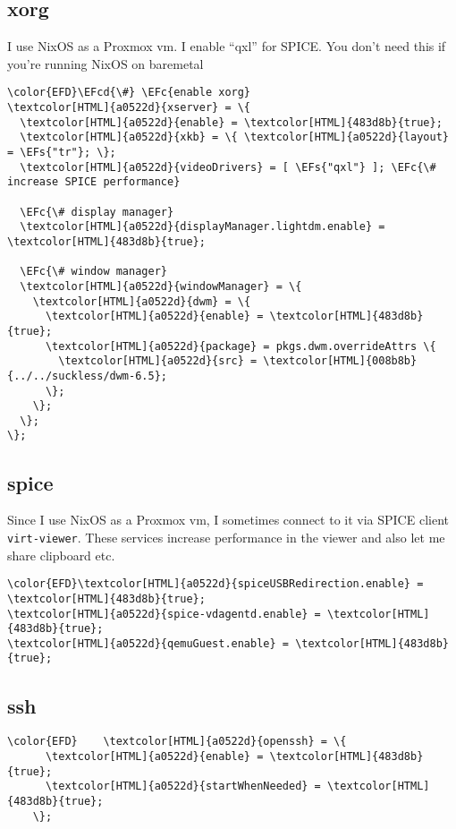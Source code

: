 \documentclass[14pt]{article}
\newcommand{\EFc}[1]{\textcolor{EFc}{#1}} %
\newcommand{\EFcd}[1]{\textcolor{EFcd}{#1}} %
\newcommand{\EFs}[1]{\textcolor{EFs}{#1}} %
\begin{document}
\subsection{xorg}
\label{sec:org418e294}
I use NixOS as a Proxmox vm. I enable ``qxl'' for SPICE. You don't need this if you're running NixOS on baremetal
\begin{Code}
\begin{Verbatim}
\color{EFD}\EFcd{\#} \EFc{enable xorg}
\textcolor[HTML]{a0522d}{xserver} = \{
  \textcolor[HTML]{a0522d}{enable} = \textcolor[HTML]{483d8b}{true};
  \textcolor[HTML]{a0522d}{xkb} = \{ \textcolor[HTML]{a0522d}{layout} = \EFs{"tr"}; \};
  \textcolor[HTML]{a0522d}{videoDrivers} = [ \EFs{"qxl"} ]; \EFc{\# increase SPICE performance}

  \EFc{\# display manager}
  \textcolor[HTML]{a0522d}{displayManager.lightdm.enable} = \textcolor[HTML]{483d8b}{true};

  \EFc{\# window manager}
  \textcolor[HTML]{a0522d}{windowManager} = \{
    \textcolor[HTML]{a0522d}{dwm} = \{
      \textcolor[HTML]{a0522d}{enable} = \textcolor[HTML]{483d8b}{true};
      \textcolor[HTML]{a0522d}{package} = pkgs.dwm.overrideAttrs \{
        \textcolor[HTML]{a0522d}{src} = \textcolor[HTML]{008b8b}{../../suckless/dwm-6.5};
      \};
    \};
  \};
\};
\end{Verbatim}
\end{Code}
\subsection{spice}
\label{sec:orgbca68a3}
Since I use NixOS as a Proxmox vm, I sometimes connect to it via SPICE client \texttt{virt-viewer}. These services increase performance in the viewer and also let me share clipboard etc.
\begin{Code}
\begin{Verbatim}
\color{EFD}\textcolor[HTML]{a0522d}{spiceUSBRedirection.enable} = \textcolor[HTML]{483d8b}{true};
\textcolor[HTML]{a0522d}{spice-vdagentd.enable} = \textcolor[HTML]{483d8b}{true};
\textcolor[HTML]{a0522d}{qemuGuest.enable} = \textcolor[HTML]{483d8b}{true};
\end{Verbatim}
\end{Code}
\subsection{ssh}
\label{sec:org9f93f3f}
\begin{Code}
\begin{Verbatim}
\color{EFD}    \textcolor[HTML]{a0522d}{openssh} = \{
      \textcolor[HTML]{a0522d}{enable} = \textcolor[HTML]{483d8b}{true};
      \textcolor[HTML]{a0522d}{startWhenNeeded} = \textcolor[HTML]{483d8b}{true};
    \};
\end{Verbatim}
\end{Code}
\end{document}
